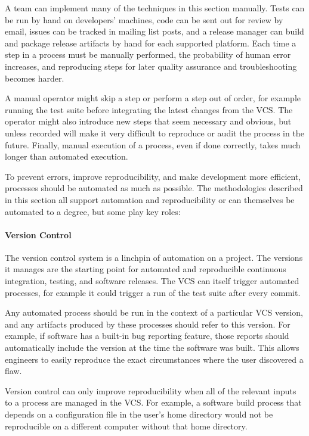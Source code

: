 A team can implement many of the techniques in this section
manually. Tests can be run by hand on developers' machines, code can
be sent out for review by email, issues can be tracked in mailing list
posts, and a release manager can build and package release artifacts
by hand for each supported platform. Each time a step in a process
must be manually performed, the probability of human error increases,
and reproducing steps for later quality assurance and troubleshooting
becomes harder.

A manual operator might skip a step or perform a step out of order,
for example running the test suite before integrating the latest
changes from the VCS. The operator might also introduce new steps that
seem necessary and obvious, but unless recorded will make it very
difficult to reproduce or audit the process in the future. Finally,
manual execution of a process, even if done correctly, takes much
longer than automated execution.

To prevent errors, improve reproducibility, and make development more
efficient, processes should be automated as much as possible. The
methodologies described in this section all support automation and
reproducibility or can themselves be automated to a degree, but some
play key roles:

\paragraph{Version Control}

The version control system is a linchpin of automation on a
project. The versions it manages are the starting point for automated
and reproducible continuous integration, testing, and software
releases. The VCS can itself trigger automated processes, for example
it could trigger a run of the test suite after every commit.

Any automated process should be run in the context of a particular VCS
version, and any artifacts produced by these processes should refer to
this version. For example, if software has a built-in bug reporting
feature, those reports should automatically include the version at the
time the software was built. This allows engineers to easily reproduce
the exact circumstances where the user discovered a flaw.

Version control can only improve reproducibility when all of the
relevant inputs to a process are managed in the VCS. For example, a
software build process that depends on a configuration file in the
user's home directory would not be reproducible on a different
computer without that home directory.

